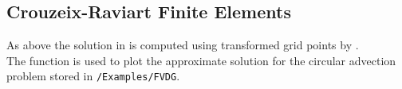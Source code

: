 
\subsection{Crouzeix-Raviart Finite Elements} 

 As above the solution in  is computed using transformed grid points by . \\

 The function is used to plot the approximate solution for the circular advection problem  stored in {\tt /Examples/FVDG}.






